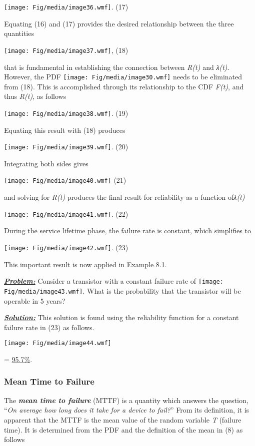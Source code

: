 \texttt{[image: Fig/media/image36.wmf]}. (17)

Equating (16) and (17) provides the desired relationship between the
three quantities

\texttt{[image: Fig/media/image37.wmf]}, (18)

that is fundamental in establishing the connection between \emph{R(t)}
and \emph{λ(t)}. However, the PDF
\texttt{[image: Fig/media/image30.wmf]} needs to be eliminated from
(18). This is accomplished through its relationship to the CDF
\emph{F(t)}, and thus \emph{R(t)}, as follows

\texttt{[image: Fig/media/image38.wmf]}. (19)

Equating this result with (18) produces

\texttt{[image: Fig/media/image39.wmf]}. (20)

Integrating both sides gives

\texttt{[image: Fig/media/image40.wmf]} (21)

and solving for \emph{R(t)} produces the final result for reliability as
a function of\emph{λ(t)}

\texttt{[image: Fig/media/image41.wmf]}. (22)

During the service lifetime phase, the failure rate is constant, which
simplifies to

\texttt{[image: Fig/media/image42.wmf]}. (23)

This important result is now applied in Example 8.1.

\emph{\textbf{\ul{Problem:}}} Consider a transistor with a constant
failure rate of \texttt{[image: Fig/media/image43.wmf]}. What is the
probability that the transistor will be operable in 5 years?

\emph{\textbf{\ul{Solution:}}} This solution is found using the
reliability function for a constant failure rate in (23) as follows.

\texttt{[image: Fig/media/image44.wmf]}

= \ul{95.7\%}.

\subsubsection{\texorpdfstring{\hfill\break
Mean Time to
Failure}{ Mean Time to Failure}}\label{mean-time-to-failure}

The \emph{\textbf{mean time to failure}} (MTTF) is a quantity which
answers the question, ``\emph{On average how long does it take for a
device to fail?}'' From its definition, it is apparent that the MTTF is
the mean value of the random variable \emph{T} (failure time). It is
determined from the PDF and the definition of the mean in (8) as follows

